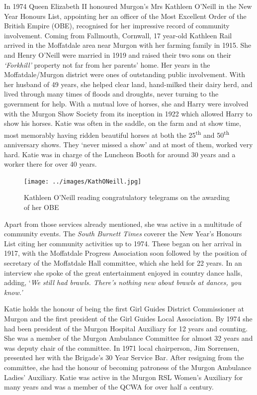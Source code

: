 In 1974 Queen Elizabeth II honoured Murgon's Mrs Kathleen O'Neill in the New Year Honours List, appointing her an officer of the Most Excellent Order of the British Empire (OBE), recognised for her impressive record of community involvement. Coming from Fallmouth, Cornwall, 17 year-old Kathleen Rail arrived in the Moffatdale area near Murgon with her farming family in 1915. She and Henry O'Neill were married in 1919 and raised their two sons on their \emph{`Forkhill'} property not far from her parents' home. Her years in the Moffatdale/Murgon district were ones of outstanding public involvement. With her husband of 49 years, she helped clear land, hand-milked their dairy herd, and lived through many times of floods and droughts, never turning to the government for help. With a mutual love of horses, she and Harry were involved with the Murgon Show Society from its inception in 1922 which allowed Harry to show his horses. Katie was often in the saddle, on the farm and at show time, most memorably having ridden beautiful horses at both the 25\textsuperscript{th} and 50\textsuperscript{th} anniversary shows. They `never missed a show' and at most of them, worked very hard. Katie was in charge of the Luncheon Booth for around 30 years and a worker there for over 40 years.









\begin{figure}
\begin{center}
\texttt{[image: ../images/KathONeill.jpg]}
\caption{Kathleen O'Neill reading congratulatory telegrams on the awarding of her OBE}
\end{center}
\end{figure}




Apart from those services already mentioned, she was active in a multitude of community events. The \emph{South Burnett Times} coverer the New Year's Honours List citing her community activities up to 1974. These began on her arrival in 1917, with the Moffatdale Progress Association soon followed by the position of secretary of the Moffatdale Hall committee, which she held for 22 years. In an interview she spoke of the great entertainment enjoyed in country dance halls, adding, `\emph{We still had brawls. There's nothing new about brawls at dances, you know.'}



Katie holds the honour of being the first Girl Guides District Commissioner at Murgon and the first president of the Girl Guides Local Association. By 1974 she had been president of the Murgon Hospital Auxiliary for 12 years and counting. She was a member of the Murgon Ambulance Committee for almost 32 years and was deputy chair of the committee. In 1971 local chairperson, Jim Sorrensen, presented her with the Brigade's 30 Year Service Bar. After resigning from the committee, she had the honour of becoming patroness of the Murgon Ambulance Ladies' Auxiliary. Katie was active in the Murgon RSL Women's Auxiliary for many years and was a member of the QCWA for over half a century.



